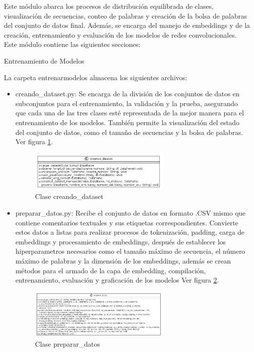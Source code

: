 Este módulo abarca los procesos de distribución equilibrada de clases, visualización de secuencias, conteo de palabras y creación de la bolsa de palabras del conjunto de datos final. Además, se encarga del manejo de embeddings y de la creación, entrenamiento y evaluación de los modelos de redes convolucionales. Este módulo contiene las siguientes secciones:

Entrenamiento de Modelos

La carpeta entrenarmodelos almacena los siguientes archivos:

\begin{itemize}

\item creando\_dataset.py: Se encarga de la división de los conjuntos de datos en subconjuntos para el entrenamiento, la validación y la prueba, asegurando que cada una de las tres clases esté representada de la mejor manera para el entrenamiento de los modelos. También permite la visualización del estado del conjunto de datos, como el tamaño de secuencias y la bolsa de palabras. Ver figura \ref{fig:uml7}.

\begin{figure}
	\includegraphics[width=0.65\textwidth]{capitulo5/figuras/fig7.png}
	\caption{Clase creando\_dataset}
	\label{fig:uml7}
\end{figure}

\item preparar\_datos.py: Recibe el conjunto de datos en formato .CSV mismo que contiene comentarios textuales y sus etiquetas correspondientes. Convierte estos datos a listas para realizar procesos de tokenización, padding, carga de embeddings y procesamiento de embeddings, después de establecer los hiperparametros necesarios como el tamaño máximo de secuencia, el número máximo de palabras y la dimensión de los embeddings, además se crean métodos para el armado de la capa de embedding, compilación, entrenamiento, evaluación y graficación de los modelos Ver figura \ref{fig:uml8}.

\begin{figure}
	\includegraphics[width=0.65\textwidth]{capitulo5/figuras/fig8.png}
	\caption{Clase preparar\_datos}
	\label{fig:uml8}
\end{figure}


\end{itemize}
